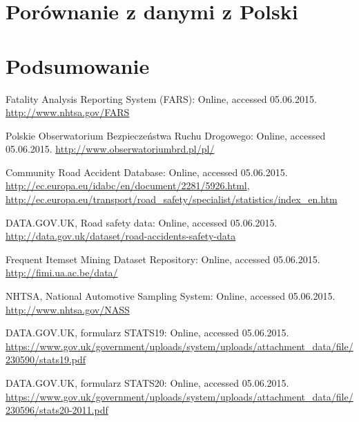 \documentclass[12pt]{aghdpl}
\begin{document}
\chapter{Porównanie z danymi z Polski}
\label{chap:porownanie_polska}


\chapter{Podsumowanie}


\begin{thebibliography}{99}

Fatality Analysis Reporting System (FARS): Online, accessed 05.06.2015. \href{http://www.nhtsa.gov/FARS}{http://www.nhtsa.gov/FARS}

Polskie Obserwatorium Bezpieczeństwa Ruchu Drogowego: Online, accessed 05.06.2015. \href{http://www.obserwatoriumbrd.pl/pl/}{http://www.obserwatoriumbrd.pl/pl/}

Community Road Accident Database: Online, accessed 05.06.2015. \href{http://ec.europa.eu/idabc/en/document/2281/5926.html}{http://ec.europa.eu/idabc/en/document/2281/5926.html}, \\ \href{http://ec.europa.eu/transport/road_safety/specialist/statistics/index_en.htm}{http://ec.europa.eu/transport/road\_safety/specialist/statistics/index\_en.htm}

DATA.GOV.UK, Road safety data: Online, accessed 05.06.2015. \href{http://data.gov.uk/dataset/road-accidents-safety-data}{http://data.gov.uk/dataset/road-accidents-safety-data}

Frequent Itemset Mining Dataset Repository: Online, accessed 05.06.2015. \href{http://fimi.ua.ac.be/data/}{http://fimi.ua.ac.be/data/}

NHTSA, National Automotive Sampling System: Online, accessed 05.06.2015. \href{http://www.nhtsa.gov/NASS}{http://www.nhtsa.gov/NASS}

DATA.GOV.UK, formularz STATS19: Online, accessed 05.06.2015. \href{https://www.gov.uk/government/uploads/system/uploads/attachment_data/file/230590/stats19.pdf}{https://www.gov.uk/government/uploads/system/uploads/attachment\_data/file/230590/stats19.pdf}


DATA.GOV.UK, formularz STATS20: Online, accessed 05.06.2015. \href{https://www.gov.uk/government/uploads/system/uploads/attachment_data/file/230596/stats20-2011.pdf}{https://www.gov.uk/government/uploads/system/uploads/attachment\_data/file/230596/stats20-2011.pdf}


\end{thebibliography}
\end{document}
